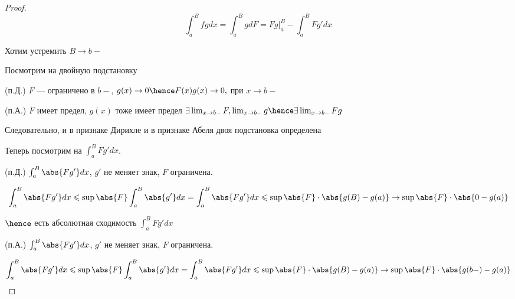 \begin{proof}
    \[
        \int_a^B fg dx = \int_a^B g dF = Fg \bigg| _a ^ B - \int_a^B F g' dx 
    \]

    Хотим устремить $B \to b-$
    
    Посмотрим на двойную подстановку
    
    (п.Д.) $F$ --- ограничено в $b-$, $g(x) \to 0 \hence F(x)g(x) \to 0, $ при $x \to b-$

    (п.А.) $F$ имеет предел, $g(x)$ тоже имеет предел $\exists \lim_{x \to b-} F, \lim_{x  \to b-} g \hence \exists \lim_{x\to b-} Fg$

    Следовательно, и в признаке Дирихле и в признаке Абеля двоя подстановка определена

    Теперь посмотрим на $\int_a^B Fg' dx$.

    (п.Д.) $\int_a^B \abs{Fg'} dx$, $g'$ не меняет знак, $F$ ограничена.

    \[
        \int_a^B \abs{Fg'} dx \leqslant \sup \abs{F} \int_a^B \abs{g'} dx = \int_a^B \abs{Fg'} dx \leqslant \sup \abs{F} \cdot \abs{g(B) - g(a)} \to \sup \abs{F} \cdot \abs{0 - g(a)}
    \]

    $\hence $ есть абсолютная сходимость $\int_a^B Fg' dx$

    (п.А.) $\int_a^B \abs{Fg'} dx$, $g'$ не меняет знак, $F$ ограничена.


    \[
        \int_a^B \abs{Fg'} dx \leqslant \sup \abs{F} \int_a^B \abs{g'} dx = \int_a^B \abs{Fg'} dx \leqslant \sup \abs{F} \cdot \abs{g(B) - g(a)} \to \sup \abs{F} \cdot \abs{g(b-) - g(a)}
    \]

\end{proof}


